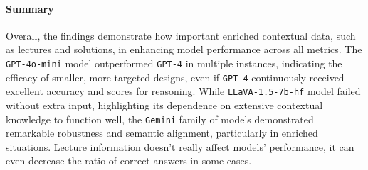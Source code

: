 \documentclass{article}
\begin{document}
\paragraph{Summary}
Overall, the findings demonstrate how important enriched contextual data, such as lectures and solutions, in enhancing model performance across all metrics. The \texttt{GPT-4o-mini} model outperformed \texttt{GPT-4} in multiple instances, indicating the efficacy of smaller, more targeted designs, even if \texttt{GPT-4} continuously received excellent accuracy and scores for reasoning. While \texttt{LLaVA-1.5-7b-hf} model failed without extra input, highlighting its dependence on extensive contextual knowledge to function well, the \texttt{Gemini} family of models demonstrated remarkable robustness and semantic alignment, particularly in enriched situations.
Lecture information doesn’t really affect models’ performance, it can even decrease the ratio of correct answers in some cases.
\end{document}
